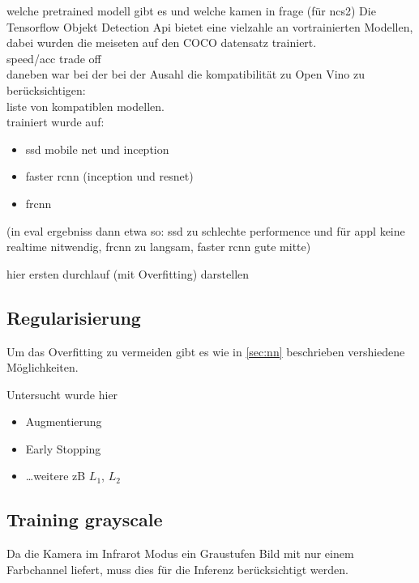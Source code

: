 welche pretrained modell gibt es und welche kamen in frage (für ncs2)
Die Tensorflow Objekt Detection Api bietet eine vielzahle an vortrainierten Modellen, 
dabei wurden die meiseten auf den COCO datensatz trainiert.\\

speed/acc trade off \\%

daneben war bei der bei der Ausahl die kompatibilität zu Open Vino zu berücksichtigen:\\
liste von kompatiblen modellen.\\

trainiert wurde auf:\\
\begin{itemize}
    \item ssd mobile net und inception
    \item faster rcnn (inception und resnet)
    \item frcnn
\end{itemize}

(in eval ergebniss dann etwa so: ssd zu schlechte 
performence und für appl keine realtime nitwendig, 
frcnn zu langsam, faster rcnn gute mitte)

hier ersten durchlauf (mit Overfitting) darstellen

\subsection{Regularisierung}

Um das Overfitting zu vermeiden gibt es wie in \ref{sec:nn} 
beschrieben vershiedene Möglichkeiten.

Untersucht wurde hier

\begin{itemize}
    \item Augmentierung
    \item Early Stopping
    \item \dots weitere zB $L_{1}$, $L_{2}$
\end{itemize}



\subsection{Training grayscale}\label{subsec:train_gray}

Da die Kamera im Infrarot Modus ein Graustufen Bild mit nur einem 
Farbchannel liefert, muss dies für die Inferenz berücksichtigt werden.

